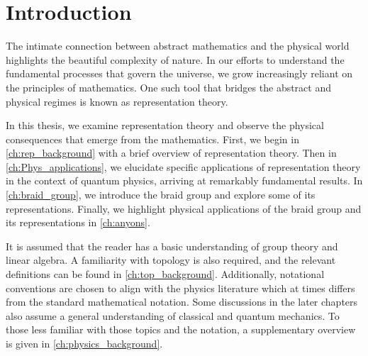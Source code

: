 \chapter{Introduction}\label{ch:introduction}

The intimate connection between abstract mathematics and the physical world highlights the beautiful complexity of nature. In our efforts to understand the fundamental processes that govern the universe, we grow increasingly reliant on the principles of mathematics. One such tool that bridges the abstract and physical regimes is known as representation theory.

In this thesis, we examine representation theory and observe the physical consequences that emerge from the mathematics. First, we begin in \cref{ch:rep_background} with a brief overview of representation theory. Then in \cref{ch:Phys_applications}, we elucidate specific applications of representation theory in the context of quantum physics, arriving at remarkably fundamental results. In \cref{ch:braid_group}, we introduce the braid group and explore some of its representations. Finally, we highlight physical applications of the braid group and its representations in \cref{ch:anyons}.

It is assumed that the reader has a basic understanding of group theory and linear algebra. A familiarity with topology is also required, and the relevant definitions can be found in \cref{ch:top_background}. Additionally, notational conventions are chosen to align with the physics literature which at times differs from the standard mathematical notation. Some discussions in the later chapters also assume a general understanding of classical and quantum mechanics. To those less familiar with those topics and the notation, a supplementary overview is given in \cref{ch:physics_background}.